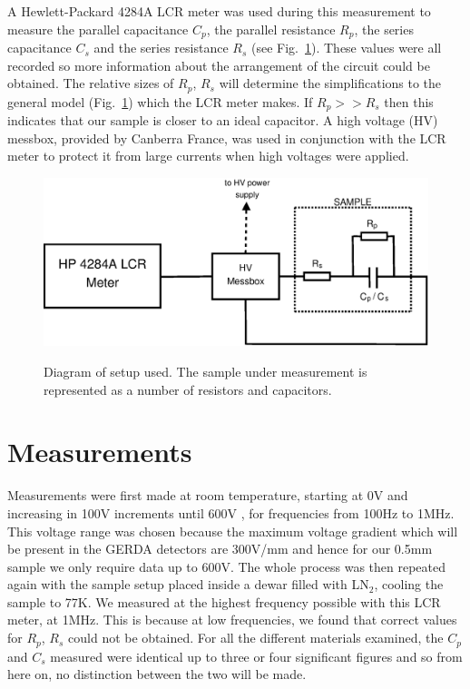 \documentclass[a4paper,11pt]{article}
\begin{document}
A Hewlett-Packard 4284A LCR meter was used during this measurement to measure the parallel capacitance $C_{p}$, the parallel resistance $R_{p}$, the series capacitance $C_{s}$ and the series resistance $R_{s}$ (see Fig.~\ref{f:setup}). These values were all recorded so more information about the arrangement of the circuit could be obtained. The relative sizes of $R_{p}$, $R_{s}$ will determine the simplifications to the general model (Fig.~\ref{f:setup}) which the LCR meter makes. If $R_{p} >> R_{s}$ then this indicates that our sample is closer to an ideal capacitor. A high voltage (HV) messbox, provided by Canberra France, was used in conjunction with the LCR meter to protect it from large currents when high voltages were applied.

\begin{figure}[htpb]
\centering
\includegraphics[scale=0.45]{basicsetup}
	\label{f:setup}
	\caption{Diagram of setup used. The sample under measurement is represented as a number of resistors and capacitors.}
\end{figure}



\section{Measurements}
\label{s:meas}

Measurements were first made at room temperature, starting at 0V and increasing in 100V increments until 600V , for frequencies from 100Hz to 1MHz. This voltage range was chosen because the maximum voltage gradient which will be present in the GERDA detectors are 300V/mm and hence for our 0.5mm sample we only require data up to 600V. The whole process was then repeated again with the sample setup placed inside a dewar filled with LN$_{2}$, cooling the sample to 77K. We measured at the highest frequency possible with this LCR meter, at 1MHz. This is because at low frequencies, we found that correct values for $R_{p}$, $R_{s}$ could not be obtained. For all the different materials examined, the $C_{p}$ and $C_{s}$ measured were identical up to three or four significant figures and so from here on, no distinction between the two will be made.\\
\end{document}
